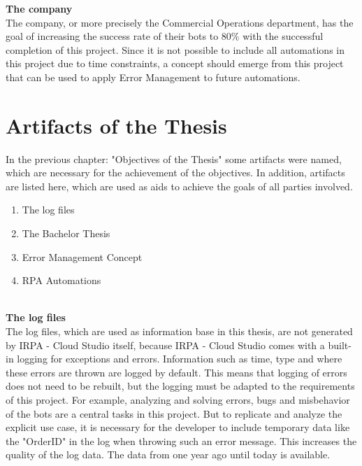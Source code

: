 \textbf{The company}\\
The company, or more precisely the Commercial Operations department, has the goal of increasing the success rate of
their bots to 80\% with the successful completion of this project.
Since it is not possible to include all automations
in this project due to time constraints, a concept should emerge from this project that can be used to apply Error Management to future automations.\\

\section{Artifacts of the Thesis}\label{sec:artifacts-of-the-thesis}
In the previous chapter: "Objectives of the Thesis" some artifacts were named, which are necessary for the achievement
of the objectives.
In addition, artifacts are listed here, which are used as aids to achieve the goals of all parties involved.\\
\begin{enumerate}
    \item {The log files}
    \item {The Bachelor Thesis}
    \item {Error Management Concept}
    \item {RPA Automations}
\end{enumerate}\\
\textbf{The log files}\\
The log files, which are used as information base in this thesis, are not generated by IRPA - Cloud Studio itself,
because IRPA - Cloud Studio comes with a built-in logging for exceptions and errors.
Information such as time, type and where these errors are thrown are logged by default.
This means that logging of errors does not need to be rebuilt, but the logging must be adapted to the requirements of this project.
For example, analyzing and solving errors, bugs and misbehavior of the bots are a central tasks in this project.
But to replicate and analyze the explicit use case, it is necessary for the developer to include temporary data like
the "OrderID" in the log when throwing such an error message.
This increases the quality of the log data.
The data from one year ago until today is available.\\

